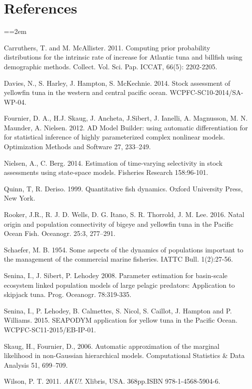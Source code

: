 \documentclass[12pt,letterpaper]{article}
\newcommand\doublespacing{\baselineskip=1.6\normalbaselineskip}
\begin{document}
\section*{References}
{\parindent=0cm \small
\everypar={\hangindent=2em }\par
Carruthers, T. and M. McAllister. 2011.
Computing prior probability distributions for the
intrinsic rate of increase for Atlantic tuna and
billfish using demographic methods.
Collect. Vol. Sci. Pap. ICCAT, 66(5): 2202-2205.

Davies, N., S. Harley, J. Hampton, S. McKechnie. 2014. Stock
assessment of yellowfin tuna in the western and central pacific ocean.
WCPFC-SC10-2014/SA-WP-04.

Fournier, D. A., H.J. Skaug, J. Ancheta, J.Sibert, J. Ianelli, 
A. Magnusson, M. N. Maunder, A. Nielsen. 2012. AD Model Builder:
using automatic differentiation for for statistical inference of highly
parameterized complex nonlinear models. Optimization Methods and
Software 27, 233–249.

Nielsen, A., C. Berg. 2014. Estimation of time-varying selectivity
in stock assessments using state-space models. Fisheries Research
158:96-101.


Quinn, T, R. Deriso. 1999. Quantitative fish dynamics. Oxford
University Press, New York.

Rooker, J.R., R. J. D. Wells, D. G. Itano, S. R. Thorrold, J. M. Lee. 2016.
Natal origin and population connectivity of bigeye and
yellowfin tuna in the Pacific Ocean
Fish. Oceanogr. 25:3, 277–291.

Schaefer, M. B. 1954. Some aspects of the dynamics of populations
important to the management of the commercial marine fisheries. IATTC
Bull. 1(2):27-56.

Senina, I., J. Sibert, P. Lehodey  2008. Parameter estimation for
basin-scale ecosystem linked population models of large pelagic
predators: Application to skipjack tuna.  Prog. Oceanogr. 78:319-335.

Senina, I.,  P. Lehodey, B. Calmettes, S. Nicol, S. Caillot,
J. Hampton and P. Williams. 2015.
SEAPODYM application for yellow tuna in the Pacific Ocean.
WCPFC-SC11-2015/EB-IP-01.


Skaug, H., Fournier, D., 2006. Automatic approximation of the marginal
likelihood in non-Gaussian hierarchical models. Computational
Statistics \& Data Analysis 51, 699–709.


Wilson, P. T. 2011. {\it AKU!}. Xlibris, USA. 368pp.ISBN
978-1-4568-5904-6.
\par}
\end{document}
